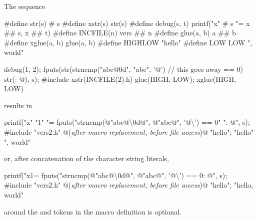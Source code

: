 \documentclass{wg21}
\newcommand{\cwhitespace}[1]{\removed{#1} \added{\grammarterm{whitespace}}}
\begin{document}
\pnum
\begin{example}
    The sequence
    \begin{codeblock}
        #define str(s)      # s
        #define xstr(s)     str(s)
        #define debug(s, t) printf("x" # s "= %
        x ## s, x ## t)
        #define INCFILE(n)  vers ## n
        #define glue(a, b)  a ## b
        #define xglue(a, b) glue(a, b)
        #define HIGHLOW     "hello"
        #define LOW         LOW ", world"
        
        debug(1, 2);
        fputs(str(strncmp("abc@\textbackslash@0d", "abc", '@')        // this goes away
        == 0) str(: @\atsign\textbackslash@n), s);
        #include xstr(INCFILE(2).h)
        glue(HIGH, LOW);
        xglue(HIGH, LOW)
    \end{codeblock}
    results in
    \begin{codeblock}
        printf("x" "1" "= %
        fputs("strncmp(@\textbackslash@"abc@\textbackslash\textbackslash@0d@\textbackslash@", @\textbackslash@"abc@\textbackslash@", '@\textbackslash{}') == 0" ": @\atsign\textbackslash@n", s);
        #include "vers2.h"      @\textrm{(\textit{after macro replacement, before file access})}@
        "hello";
        "hello" ", world"
    \end{codeblock}
    or, after concatenation of the character string literals,
    \begin{codeblock}
        printf("x1= %
        fputs("strncmp(@\textbackslash@"abc@\textbackslash\textbackslash@0d@\textbackslash@", @\textbackslash@"abc@\textbackslash@", '@\textbackslash{}') == 0: @\atsign\textbackslash@n", s);
        #include "vers2.h"      @\textrm{(\textit{after macro replacement, before file access})}@
        "hello";
        "hello, world"
    \end{codeblock}
    
    \cwhitespace{Space} around the \tcode{\#} and \tcode{\#\#} tokens in the macro definition
    is optional.
\end{example}
\end{document}
